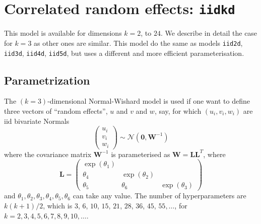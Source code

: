 \documentclass[a4paper,11pt]{article}
\begin{document}
\section*{Correlated random effects: \texttt{iidkd}}

This model is available for dimensions $k=2$, to $24$. We describe in
detail the case for $k=3$ as other ones are similar. This model do the
same as models \texttt{iid2d}, \texttt{iid3d}, \texttt{iid4d},
\texttt{iid5d}, but uses a different and more efficient parameterisation. 

\subsection*{Parametrization}

The $(k=3)$-dimensional Normal-Wishard model is used if one want to define
three vectors of ``random effects'', $u$ and $v$ and $w$, say, for which
$(u_{i}, v_{i}, w_i)$ are iid bivariate Normals
\begin{displaymath}
    \left(
      \begin{array}{c}
        u_{i}\\
        v_{i}\\
        w_{i}
      \end{array}\right)
    \sim \mathcal{N}\left(\mathbf{0}, \mathbf{W}^{-1}\right)
\end{displaymath}
where the  covariance matrix $\mathbf{W}^{-1}$ is parameterised as
$\mathbf{W}=\mathbf{L}\mathbf{L}^{T}$, where
\begin{equation}
    \label{precision}
    \mathbf{L} = \left(\begin{array}{ccc}
                         \exp(\theta_1) & & \\
                         \theta_4 & \exp(\theta_2) & \\
                         \theta_5 & \theta_6 & \exp(\theta_3)
      \end{array}\right)
\end{equation}
and $\theta_1, \theta_2, \theta_3, \theta_4, \theta_5, \theta_6$ can
take any value. The number of hyperparameters are $k(k+1)/2$, which is
$3$, $6$, $10$, $15$, $21$, $28$, $36$, $45$, $55, \ldots$, for
$k=2, 3, 4, 5, 6, 7, 8, 9, 10, \ldots$.
\end{document}

